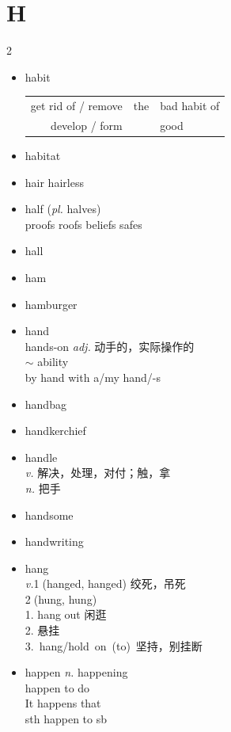 \documentclass[../../book.tex]{subfiles}
\begin{document}
\section{H}
\raggedcolumns
\begin{multicols}{2}
\begin{itemize}
\item[-] habit
\\\begin{tabular}{@{} r  @{ } l  @{ } l @{}}
get rid of / remove & the & bad habit of
\\develop / form & & good
\end{tabular}
\item[-] habitat
\item[-] hair \phantom{a} hairless
\item[-] half (\emph{pl.} halves)
\\{\color{violet}proofs roofs beliefs safes}
\item[-] hall
\item[-] ham
\item[-] hamburger
\item[-] hand
\\hands-on \emph{adj.} 动手的，实际操作的 \\\phantom{aaaaaaaaaaa..} $\sim$ ability
\\by hand \phantom{a} with a/my hand/-s
\item[-] handbag
\item[-] handkerchief
\item[-] handle
\\\emph{v.} 解决，处理，对付；触，拿
\\\emph{n.} 把手
\item[-] handsome
\item[-] handwriting
\item[-] hang
\\\emph{v.}\textcircled{1}(hanged, hanged) 绞死，吊死
\\\textcircled{2}(hung, hung)
\\1. hang out 闲逛
\\2. 悬挂
\\\mbox{3. hang/hold on (to) 坚持，别挂断}
\item[-] happen \phantom{a} \emph{n.} happening
\\happen to do
\\It happens that
\\sth happen to sb

\end{itemize}
\end{multicols}
\end{document}
